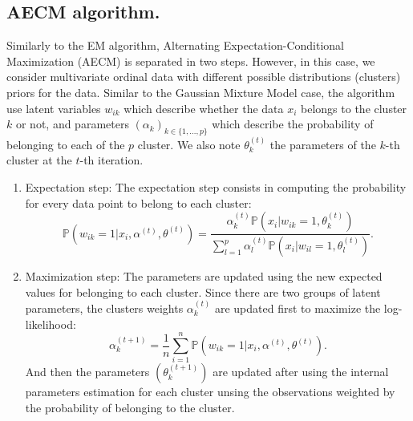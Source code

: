 \subsection{AECM algorithm.} 
\label{sec:aecm}

Similarly to the EM algorithm, Alternating Expectation-Conditional Maximization (AECM) \citep{meng1997algorithm} is separated in two steps. However, in this case, we consider multivariate ordinal data with different possible distributions (clusters) priors for the data. Similar to the Gaussian Mixture Model case, the algorithm use latent variables $w_{ik}$ which describe whether the data $x_i$ belongs to the cluster $k$ or not, and parameters $(\alpha_k)_{k\in \{1, \ldots, p\}}$ which describe the probability of belonging to each of the $p$ cluster. We also note $\theta_k^{(t)}$ the parameters of the $k$-th cluster at the $t$-th iteration.
\begin{enumerate}
    \item Expectation step: The expectation step consists in computing the probability for every data point to belong to each cluster:
    \begin{equation}
        \mathbb{P}(w_{ik}=1|x_i, \alpha^{(t)}, \theta^{(t)}) = \frac{\alpha_k^{(t)}\mathbb{P}(x_i|w_{ik}=1, \theta_k^{(t)})}{\sum_{l=1}^p\alpha_l^{(t)}\mathbb{P}(x_i|w_{il}=1, \theta_l^{(t)})}.
    \end{equation}
    \item Maximization step: The parameters are updated using the new expected values for belonging to each cluster. Since there are two groups of latent parameters, the clusters weights $\alpha_k^{(t)}$ are updated first to maximize the log-likelihood:
    \begin{equation}
    \alpha_k^{(t+1)} = \frac{1}{n} \sum_{i=1}^n \mathbb{P}(w_{ik}=1|x_i, \alpha^{(t)}, \theta^{(t)}).
    \end{equation}
    And then the parameters $(\theta_k^{(t + 1)})$ are updated after using the internal parameters estimation for each cluster unsing the observations weighted by the probability of belonging to the cluster.


\end{enumerate}

